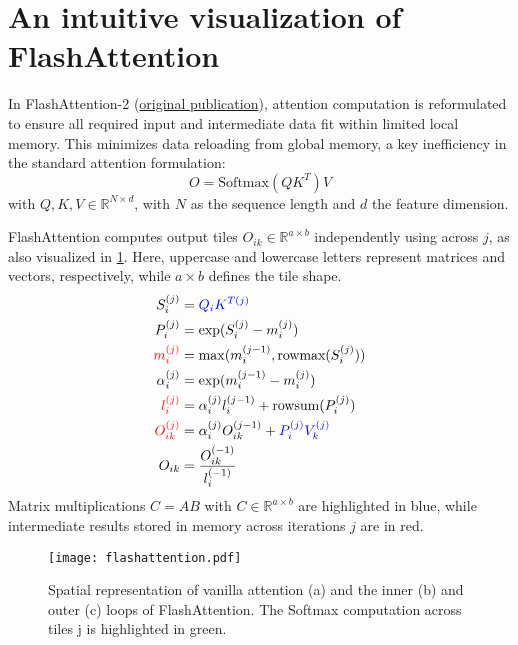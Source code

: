 \documentclass{article}
\begin{document}
\section*{An intuitive visualization of FlashAttention}

In FlashAttention-2 (\href{https://arxiv.org/abs/2307.08691}{original publication}), attention computation is reformulated to ensure all required input and intermediate data fit within limited local memory.
This minimizes data reloading from global memory, a key inefficiency in the standard attention formulation:
$$ O = \mathrm{Softmax}(Q K^T)V $$
with $Q, K, V \in \mathbb{R}^{N \times d}$, with $N$ as the sequence length and $d$ the feature dimension.

FlashAttention computes output tiles $O_{ik} \in \mathbb{R}^{a \times b}$ independently using  across $j$, as also visualized in \cref{fig:flashattention}.
Here, uppercase and lowercase letters represent matrices and vectors, respectively, while $a \times b$ defines the tile shape.
\begin{align}
  S_i^{(j)} &= \textcolor{blue}{Q_i K^{T(j)}} \label{eq:s} \\
  P_i^{(j)} &= \exp(S_i^{(j)} - m_i^{(j)}) \label{eq:p} \\
  \textcolor{red}{m_i^{(j)}} &= \max(m_i^{(j-1)}, \text{rowmax} (S_i^{(j)})) \label{eq:m} \\
  \alpha_i^{(j)} &= \exp(m_i^{(j-1)} - m_i^{(j)}) \label{eq:alpha} \\
  \textcolor{red}{l_i^{(j)}} &= \alpha_i^{(j)} l_i^{(j-1)} + \text{rowsum}(P_i^{(j)}) \label{eq:l} \\
  \textcolor{red}{O_{ik}^{(j)}} &= \alpha_i^{(j)} O_{ik}^{(j-1)} + \textcolor{blue}{P_i^{(j)} V_k^{(j)}} \label{eq:oikj} \\
  O_{ik} &= \frac{O_{ik}^{(-1)}}{l_i^{(-1)}} \label{eq:oik}
\end{align}
Matrix multiplications $C=AB$ with $C \in \mathbb{R}^{a \times b}$ are highlighted in blue, while intermediate results stored in memory across iterations $j$ are in red.

\begin{figure}
  \centering
  \texttt{[image: flashattention.pdf]}
  \caption{
    Spatial representation of vanilla attention (a) and the inner (b) and outer (c) loops of FlashAttention.
    The Softmax computation across tiles j is highlighted in green.
  }
  \label{fig:flashattention}
\end{figure}
\end{document}
